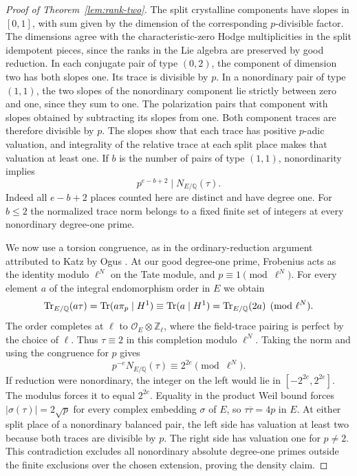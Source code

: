 \begin{proof}[Proof of Theorem~\ref{lem:rank-two}]
The split crystalline components have slopes in \([0,1]\), with sum
given by the dimension of the corresponding \(p\)-divisible factor.
The dimensions agree with the characteristic-zero Hodge
multiplicities in the split idempotent pieces, since the ranks in
the Lie algebra are preserved by good reduction. In each conjugate pair
of type \((0,2)\), the component of dimension two has both slopes one.
Its trace is divisible by \(p\).
In a nonordinary pair of type \((1,1)\), the two slopes of the
nonordinary component lie strictly between zero and one, since they
sum to one. The polarization pairs that component with slopes obtained
by subtracting its slopes from one. Both component traces are therefore
divisible by \(p\). The slopes show that each trace has positive
\(p\)-adic valuation, and integrality of the relative trace at each
split place makes that valuation at least one.
If \(b\) is the number of pairs of type \((1,1)\), nonordinarity implies
\[
                         p^{e-b+2}\mid N_{E/\mathbb Q}(\tau).
\]
Indeed all \(e-b+2\) places counted here are distinct and have degree one.
For \(b\leq2\) the normalized trace norm belongs to a fixed finite set
of integers at every nonordinary degree-one prime.

We now use a torsion congruence, as in the ordinary-reduction argument
attributed to Katz by Ogus \cite[Proposition~2.7.2]{ogus}. At our good
degree-one prime, Frobenius acts as the identity modulo \(\ell^N\) on
the Tate module, and \(p\equiv1\pmod{\ell^N}\). For every element \(a\)
of the integral endomorphism order in \(E\) we obtain
\[
  \operatorname{Tr}_{E/\mathbb Q}(a\tau)
    =\operatorname{Tr}(a\pi_p\mid H^1)
    \equiv\operatorname{Tr}(a\mid H^1)
    =\operatorname{Tr}_{E/\mathbb Q}(2a)
    \pmod{\ell^N}.
\]
The order completes at \(\ell\) to \(\mathcal O_E\otimes\mathbb Z_\ell\),
where the field-trace pairing is perfect by the choice of \(\ell\).
Thus \(\tau\equiv2\) in this completion modulo \(\ell^N\). Taking the
norm and using the congruence for \(p\) gives
\[
 p^{-e}N_{E/\mathbb Q}(\tau) \equiv 2^{2e}\pmod{\ell^N}.
\]
If reduction were nonordinary, the integer on the left would lie in
\([-2^{2e},2^{2e}]\). The modulus forces it to equal \(2^{2e}\).
Equality in the product Weil bound forces \(|\sigma(\tau)|=2\sqrt p\)
for every complex embedding \(\sigma\) of \(E\), so
\(\tau\overline{\tau}=4p\) in \(E\). At either split place of a
nonordinary balanced pair, the left side has valuation at least two
because both traces are divisible by \(p\). The right side has
valuation one for \(p\ne2\). This contradiction excludes all
nonordinary absolute degree-one primes outside the finite exclusions
over the chosen extension, proving the density claim.
\end{proof}

